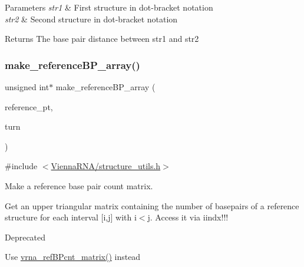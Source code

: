 \begin{DoxyParams}{Parameters}
{\em str1} & First structure in dot-\/bracket notation \\
\hline
{\em str2} & Second structure in dot-\/bracket notation \\
\hline
\end{DoxyParams}
\begin{DoxyReturn}{Returns}
The base pair distance between str1 and str2 
\end{DoxyReturn}
\mbox{\label{group__struct__utils_ga578cd9712dee812fb1c58aa3cc489864}} 
\subsubsection{\texorpdfstring{make\+\_\+reference\+B\+P\+\_\+array()}{make\_referenceBP\_array()}}
{\footnotesize\ttfamily unsigned int$\ast$ make\+\_\+reference\+B\+P\+\_\+array (\begin{DoxyParamCaption}\item[{short $\ast$}]{reference\+\_\+pt,  }\item[{unsigned int}]{turn }\end{DoxyParamCaption})}



{\ttfamily \#include $<$\mbox{\hyperlink{structure__utils_8h}{Vienna\+R\+N\+A/structure\+\_\+utils.\+h}}$>$}



Make a reference base pair count matrix. 

Get an upper triangular matrix containing the number of basepairs of a reference structure for each interval \mbox{[}i,j\mbox{]} with i$<$j. Access it via iindx!!!

\begin{DoxyRefDesc}{Deprecated}
\item[\mbox{\hyperlink{deprecated__deprecated000145}{Deprecated}}]Use \mbox{\hyperlink{group__struct__utils_gab4c2a00c99ce1d612ffa5bde114eb96d}{vrna\+\_\+ref\+B\+Pcnt\+\_\+matrix()}} instead \end{DoxyRefDesc}
\mbox{\label{group__struct__utils_gadd463184355d0803b6ee6e09f29182f2}} 
